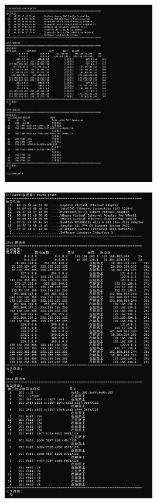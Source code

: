 \documentclass{article}
\begin{document}
\vspace{10pt}
\centerline{\includegraphics[width=0.5\textwidth]{3_1_images/19.png}}
\vspace{10pt}

\vspace{10pt}
\centerline{\includegraphics[width=0.5\textwidth]{3_1_images/20.png}}
\vspace{10pt}
\end{document}
